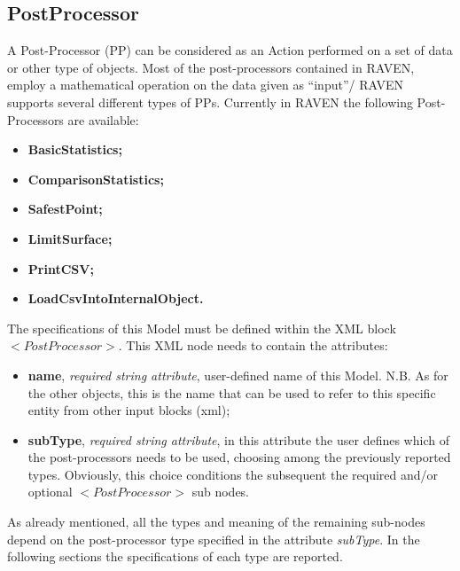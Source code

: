 \subsection{PostProcessor}
\label{sec:models_postProcessor}
A Post-Processor (PP) can be considered as an Action performed on a set of data or other type of objects. Most of the post-processors contained in RAVEN, employ a mathematical operation on the data given as ``input''/
RAVEN supports several different types of PPs. Currently in RAVEN the following Post-Processors are available:
\begin{itemize}
   \item \textbf{BasicStatistics;}
   \item \textbf{ComparisonStatistics;}
   \item \textbf{SafestPoint;}
   \item \textbf{LimitSurface;}
   \item \textbf{PrintCSV;}
   \item \textbf{LoadCsvIntoInternalObject.}
\end{itemize}
The specifications of this Model must be defined within the XML block $<PostProcessor>$. This XML node needs to contain the attributes:
\vspace{-5mm}
\begin{itemize}
\itemsep0em
\item \textbf{name}, \textit{required string attribute}, user-defined name of this Model. N.B. As for the other objects, this is the name that can be used to refer to this specific entity from other input blocks (xml);
\item \textbf{subType}, \textit{required string attribute}, in this attribute the user defines which of the post-processors needs to be used, choosing among the previously reported types. Obviously, this choice conditions the subsequent the required and/or optional $<PostProcessor>$ sub nodes.
\end{itemize}
\vspace{-5mm}
As already mentioned, all the types and meaning of the remaining sub-nodes depend on the post-processor type specified in the attribute \textit{subType}. In the following sections the specifications of each type are reported.
